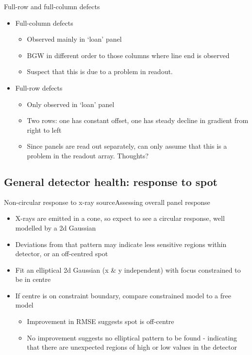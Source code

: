 \documentclass{beamer}
\begin{document}

\begin{frame}{Full-row and full-column defects}

	\begin{itemize}
		\item Full-column defects
		\begin{itemize}
			\item Observed mainly in `loan' panel
			\item BGW in different order to those columns where line end is observed
			\item Suspect that this is due to a problem in readout.
		\end{itemize}
		\item Full-row defects
		\begin{itemize}
			\item Only observed in `loan' panel
			\item Two rows: one has constant offset, one has steady decline in gradient from right to left
			\item Since panels are read out separately, can only assume that this is a problem in the readout array. Thoughts?
		\end{itemize}
	\end{itemize}
	
\end{frame}


\subsection{General detector health: response to spot}


\begin{frame}{Non-circular response to x-ray source}{Assessing overall panel response}
  \begin{itemize}
  	\item X-rays are emitted in a cone, so expect to see a circular response, well modelled by a 2d Gaussian
  	\item Deviations from that pattern may indicate less sensitive regions within detector, or an off-centred spot
  	
  	\item Fit an elliptical 2d Gaussian (x \& y independent) with focus constrained to be in centre
  	\item If centre is on constraint boundary, compare constrained model to a free model
  	\begin{itemize}
  		\item Improvement in RMSE suggests spot is off-centre
  		\item No improvement suggests no elliptical pattern to be found - indicating that there are unexpected regions of high or low values in the detector
	\end{itemize}
  \end{itemize}
\end{frame}
\end{document}
